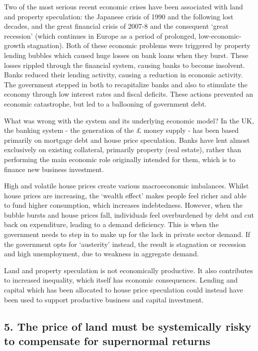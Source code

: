 \documentclass[]{tufte-handout}
\begin{document}
Two of the most serious recent economic crises have been associated with
land and property speculation: the Japanese crisis of 1990 and the
following lost decades, and the great financial crisis of 2007-8 and the
consequent `great recession' (which continues in Europe as a period of
prolonged, low-economic-growth stagnation). Both of these economic
problems were triggered by property lending bubbles which caused huge
losses on bank loans when they burst. These losses rippled through the
financial system, causing banks to become insolvent. Banks reduced their
lending activity, causing a reduction in economic activity. The
government stepped in both to recapitalize banks and also to stimulate
the economy through low interest rates and fiscal deficits. These
actions prevented an economic catastrophe, but led to a ballooning of
government debt.

What was wrong with the system and its underlying economic model? In the
UK, the banking system - the generation of the £ money supply - has been
based primarily on mortgage debt and house price speculation. Banks have
lent almost exclusively on existing collateral, primarily property (real
estate), rather than performing the main economic role originally
intended for them, which is to finance new business investment.

High and volatile house prices create various macroeconomic imbalances.
Whilst house prices are increasing, the `wealth effect' makes people
feel richer and able to fund higher consumption, which increases
indebtedness. However, when the bubble bursts and house prices fall,
individuals feel overburdened by debt and cut back on expenditure,
leading to a demand deficiency. This is when the government needs to
step in to make up for the lack in private sector demand. If the
government opts for `austerity' instead, the result is stagnation or
recession and high unemployment, due to weakness in aggregate demand.

Land and property speculation is not economically productive. It also
contributes to increased inequality, which itself has economic
consequences. Lending and capital which has been allocated to house
price speculation could instead have been used to support productive
business and capital investment.

\hypertarget{the-price-of-land-must-be-systemically-risky-to-compensate-for-supernormal-returns}{%
\subsection{5. The price of land must be systemically risky to
compensate for supernormal
returns}\label{the-price-of-land-must-be-systemically-risky-to-compensate-for-supernormal-returns}}
\end{document}
